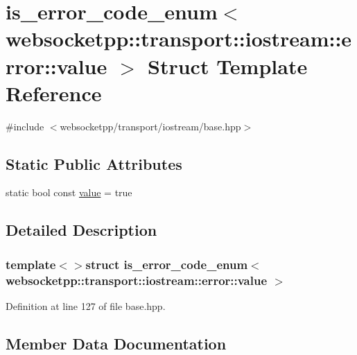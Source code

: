 \hypertarget{structis__error__code__enum_3_01websocketpp_1_1transport_1_1iostream_1_1error_1_1value_01_4}{}\section{is\+\_\+error\+\_\+code\+\_\+enum$<$ websocketpp\+:\+:transport\+:\+:iostream\+:\+:error\+:\+:value $>$ Struct Template Reference}
\label{structis__error__code__enum_3_01websocketpp_1_1transport_1_1iostream_1_1error_1_1value_01_4}


{\ttfamily \#include $<$websocketpp/transport/iostream/base.\+hpp$>$}

\subsection*{Static Public Attributes}
\begin{DoxyCompactItemize}
\item 
static bool const \hyperlink{structis__error__code__enum_3_01websocketpp_1_1transport_1_1iostream_1_1error_1_1value_01_4_a8d3f807aad82dad37582b8331d2d077a}{value} = true
\end{DoxyCompactItemize}


\subsection{Detailed Description}
\subsubsection*{template$<$$>$struct is\+\_\+error\+\_\+code\+\_\+enum$<$ websocketpp\+::transport\+::iostream\+::error\+::value $>$}



Definition at line 127 of file base.\+hpp.



\subsection{Member Data Documentation}
\hypertarget{structis__error__code__enum_3_01websocketpp_1_1transport_1_1iostream_1_1error_1_1value_01_4_a8d3f807aad82dad37582b8331d2d077a}{}
